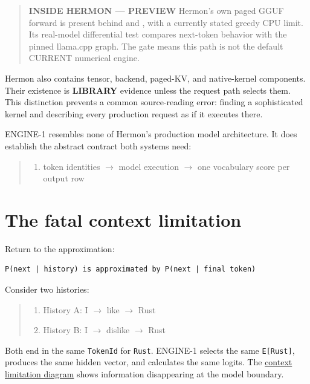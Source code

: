 \begin{quote}
\textbf{INSIDE HERMON --- PREVIEW} Hermon's own paged GGUF forward is
present behind \texttt{} and
\texttt{}, with a currently stated
greedy CPU limit. Its real-model differential test compares next-token
behavior with the pinned llama.cpp graph. The gate means this path is
not the default CURRENT numerical engine.
\end{quote}

Hermon also contains tensor, backend, paged-KV, and native-kernel
components. Their existence is \textbf{LIBRARY} evidence unless the
request path selects them. This distinction prevents a common
source-reading error: finding a sophisticated kernel and describing
every production request as if it executes there.

ENGINE-1 resembles none of Hermon's production model architecture. It
does establish the abstract contract both systems need:

\begin{quote}
\begin{enumerate}
\item token identities  \(\longrightarrow\)  model execution  \(\longrightarrow\)  one vocabulary score per output row
\end{enumerate}
\end{quote}

\section{The fatal context
limitation}\label{the-fatal-context-limitation}

Return to the approximation:

\begin{verbatim}
P(next | history) is approximated by P(next | final token)
\end{verbatim}

Consider two histories:

\begin{quote}
\begin{enumerate}
\item History A: I  \(\longrightarrow\)  like     \(\longrightarrow\)  Rust
\item History B: I  \(\longrightarrow\)  dislike  \(\longrightarrow\)  Rust
\end{enumerate}
\end{quote}

Both end in the same \texttt{TokenId} for \texttt{Rust}. ENGINE-1
selects the same \texttt{E{[}Rust{]}}, produces the same hidden vector,
and calculates the same logits. The
\href{https://github.com/hermonai/inside-the-llm-engine/blob/astra-visual-rewrite/diagrams/model/context-limitation.txt}{context
limitation diagram} shows information disappearing at the model
boundary.

